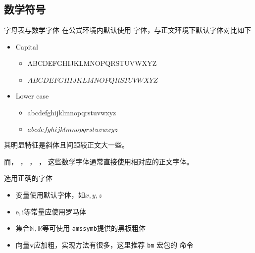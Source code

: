 \subsection{数学符号}
\begin{frame}[fragile]{字母表与数学字体}
	在公式环境内默认使用 \cprotect\fbox{\verb|\mathnormal|} 字体，与正文环境下默认字体对比如下
	\begin{itemize}
		\item Capital
		\begin{itemize}
			\item \textrm{ABCDEFGHIJKLMNOPQRSTUVWXYZ}
			\item $ABCDEFGHIJKLMNOPQRSTUVWXYZ$
		\end{itemize}
		\item Lower case
		\begin{itemize}
			\item \textrm{abcdefghijklmnopqrstuvwxyz}
			\item $abcdefghijklmnopqrstuvwxyz$
		\end{itemize}
	\end{itemize}
	其明显特征是斜体且间距较正文大一些。

	\vspace{2ex}
	而\cprotect\fbox{\verb|\mathit|}， \cprotect\fbox{\verb|\mathrm|}， \cprotect\fbox{\verb|\mathbf|}， \cprotect\fbox{\verb|\mathsf|}， \cprotect\fbox{\verb|\mathtt|} 这些数学字体通常直接使用相对应的正文字体\cprotect\fbox{\verb|\text**|}。
\end{frame}
\begin{frame}[fragile]{选用正确的字体}
	\begin{itemize}
		\item 变量使用默认字体，如$x, y, z$
		\item $\mathrm{e}, \mathrm{i}$等常量应使用罗马体 \cprotect\fbox{\verb|\mathrm|}
		\item 集合$\mathbb{N}, \mathbb{R}$等可使用 \verb|amssymb|提供的黑板粗体 \cprotect\fbox{\verb|\mathbb|}
		\item 向量$\bm{v}$应加粗，实现方法有很多，这里推荐 \verb|bm| 宏包的 \cprotect\fbox{\verb|\bm|} 命令
	\end{itemize}
\end{frame}
